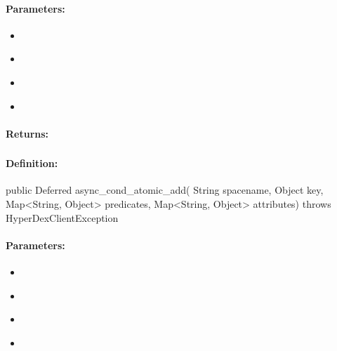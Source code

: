 \paragraph{Parameters:}
\begin{itemize}[noitemsep]
\item {}\\

\item {}\\

\item {}\\

\item {}\\

\end{itemize}

\paragraph{Returns:}


\pagebreak
\subsubsection{}
\label{api:java:async_cond_atomic_add}


\paragraph{Definition:}
\begin{javacode}
public Deferred async_cond_atomic_add(
        String spacename,
        Object key,
        Map<String, Object> predicates,
        Map<String, Object> attributes) throws HyperDexClientException
\end{javacode}

\paragraph{Parameters:}
\begin{itemize}[noitemsep]
\item {}\\

\item {}\\

\item {}\\

\item {}\\

\end{itemize}

